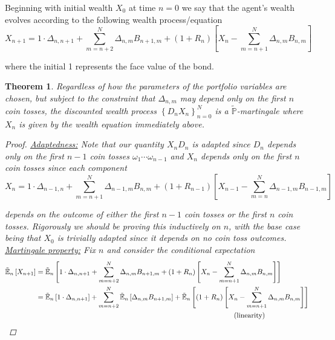 \documentclass[12pt]{article}
\newtheorem{theorem}{Theorem}
\newlength\tindent
\renewcommand{\indent}{\hspace*{\tindent}}
\renewcommand{\P}{\mathbb P}
\newcommand{\E}{\mathbb E}
\begin{document}
\indent Beginning with initial wealth $X_0$ at time $n = 0$ we say that the agent's wealth evolves according to the following wealth process/equation
\begin{equation*}
	X_{n + 1} = 1\cdot\Delta_{n,n + 1} + \sum^N_{m = n + 2} \Delta_{n,m}B_{n + 1,m} + (1 + R_n)\left[X_n - \sum^N_{m = n + 1} \Delta_{n,m}B_{n,m} \right]
\end{equation*}

where the initial 1 represents the face value of the bond.

\begin{theorem} Regardless of how the parameters of the portfolio variables are chosen, but subject to the constraint that $\Delta_{n,m}$ may depend only on the first $n$ coin tosses, the discounted wealth process $\left\{D_nX_n\right\}^N_{n = 0}$ is a $\tilde{\P}$-martingale where $X_n$ is given by the wealth equation immediately above.

\begin{proof} \underline{Adaptedness:} Note that our quantity $X_nD_n$ is adapted since $D_n$ depends only on the first $n - 1$ coin tosses $\omega_1\cdots\omega_{n - 1}$ and $X_n$ depends only on the first $n$ coin tosses since each component
\begin{equation*}
	X_n = 1\cdot\Delta_{n - 1,n} + \sum^N_{m = n + 1} \Delta_{n - 1,m}B_{n,m} + (1 + R_{n - 1})\left[X_{n - 1} - \sum^N_{m = n} \Delta_{n - 1,m}B_{n - 1,m} \right]
\end{equation*}

depends on the outcome of either the first $n - 1$ coin tosses or the first $n$ coin tosses. Rigorously we should be proving this inductively on $n$, with the base case being that $X_0$ is trivially adapted since it depends on no coin toss outcomes. \\

\underline{Martingale property:} Fix $n$ and consider the conditional expectation
\begin{align*}
	\tilde{\E}_n \left[ X_{n + 1} \right] &= \tilde{\E}_n \left[ 1\cdot\Delta_{n,n + 1} + \sum^N_{m = n + 2} \Delta_{n,m}B_{n + 1,m} + (1 + R_n)\left[X_n - \sum^N_{m = n + 1} \Delta_{n,m}B_{n,m} \right] \right] \\
	&= \tilde{\E}_n \left[ 1\cdot\Delta_{n,n + 1} \right] + \sum^N_{m = n + 2} \tilde{\E}_n \left[ \Delta_{n,m}B_{n + 1,m} \right] + \tilde{\E}_n \left[ (1 + R_n) \left[X_n - \sum^N_{m = n + 1} \Delta_{n,m}B_{n,m} \right] \right] \\
	&\hphantom{{}={--------------------------}} \quad \text{(linearity)}
\end{align*}


\end{proof}
\end{theorem}
\end{document}
